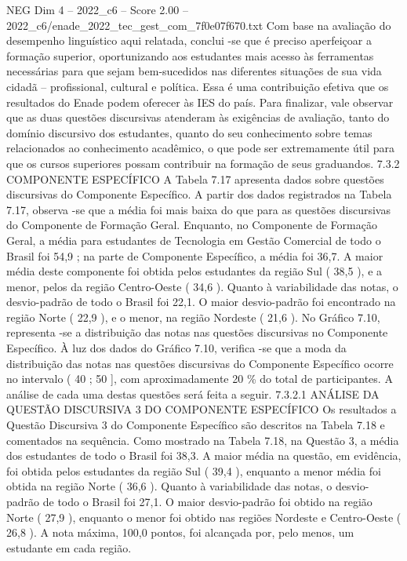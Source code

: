 \begin{textsample}{NEG Dim 4 – 2022\_c6 – Score 2.00 – 2022\_c6/enade\_2022\_tec\_gest\_com\_7f0e07f670.txt}
Com base na avaliação do desempenho linguístico aqui relatada, conclui -se que é preciso aperfeiçoar a formação superior, oportunizando aos estudantes mais acesso às ferramentas necessárias para que sejam bem-sucedidos nas diferentes situações de sua vida cidadã – profissional, cultural e política.
Essa é uma contribuição efetiva que os resultados do Enade podem oferecer às IES do país.
Para finalizar, vale observar que as duas questões discursivas atenderam às exigências de avaliação, tanto do domínio discursivo dos estudantes, quanto do seu conhecimento sobre temas relacionados ao conhecimento acadêmico, o que pode ser extremamente útil para que os cursos superiores possam contribuir na formação de seus graduandos. 7.3.2 COMPONENTE ESPECÍFICO A Tabela 7.17 apresenta dados sobre questões discursivas do Componente Específico.
A partir dos dados registrados na Tabela 7.17, observa -se que a média foi mais baixa do que para as questões discursivas do Componente de Formação Geral.
Enquanto, no Componente de Formação Geral, a média para estudantes de Tecnologia em Gestão Comercial de todo o Brasil foi 54,9 ; na parte de Componente Específico, a média foi 36,7.
A maior média deste componente foi obtida pelos estudantes da região Sul ( 38,5 ), e a menor, pelos da região Centro-Oeste ( 34,6 ).
Quanto à variabilidade das notas, o desvio-padrão de todo o Brasil foi 22,1.
O maior desvio-padrão foi encontrado na região Norte ( 22,9 ), e o menor, na região Nordeste ( 21,6 ).
No Gráfico 7.10, representa -se a distribuição das notas nas questões discursivas no Componente Específico.
À luz dos dados do Gráfico 7.10, verifica -se que a moda da distribuição das notas nas questões discursivas do Componente Específico ocorre no intervalo ( 40 ; 50 ], com aproximadamente 20 \% do total de participantes.
A análise de cada uma destas questões será feita a seguir. 7.3.2.1 ANÁLISE DA QUESTÃO DISCURSIVA 3 DO COMPONENTE ESPECÍFICO Os resultados a Questão Discursiva 3 do Componente Específico são descritos na Tabela 7.18 e comentados na sequência.
Como mostrado na Tabela 7.18, na Questão 3, a média dos estudantes de todo o Brasil foi 38,3.
A maior média na questão, em evidência, foi obtida pelos estudantes da região Sul ( 39,4 ), enquanto a menor média foi obtida na região Norte ( 36,6 ).
Quanto à variabilidade das notas, o desvio-padrão de todo o Brasil foi 27,1.
O maior desvio-padrão foi obtido na região Norte ( 27,9 ), enquanto o menor foi obtido nas regiões Nordeste e Centro-Oeste ( 26,8 ).
A nota máxima, 100,0 pontos, foi alcançada por, pelo menos, um estudante em cada região.

\end{textsample}
